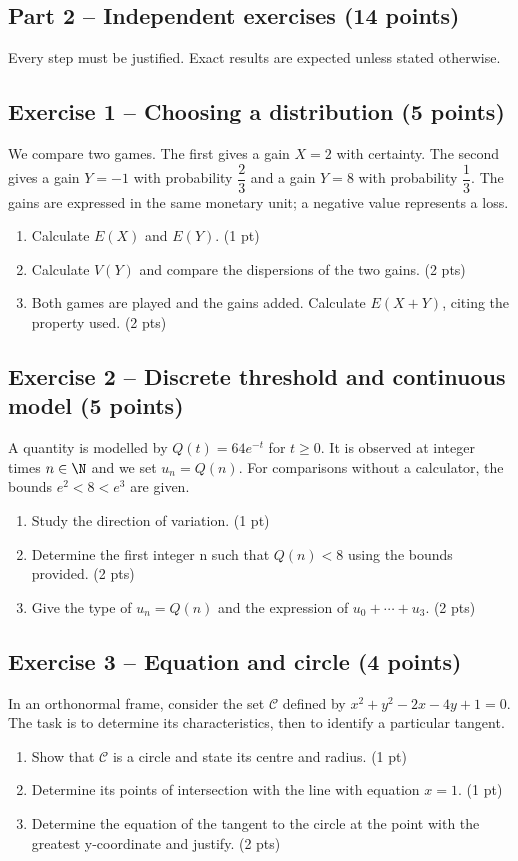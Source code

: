 \mxnewpage\subsection*{Part 2 -- Independent exercises (14 points)}
Every step must be justified. Exact results are expected unless stated otherwise.
\subsection*{Exercise 1 -- Choosing a distribution (5 points)}
We compare two games. The first gives a gain $X=2$ with certainty. The second gives a gain $Y=-1$ with probability $\dfrac23$ and a gain $Y=8$ with probability $\dfrac13$. The gains are expressed in the same monetary unit; a negative value represents a loss.
\begin{enumerate}
\item Calculate $E(X)$ and $E(Y)$. \hfill(1 pt)
\item Calculate $V(Y)$ and compare the dispersions of the two gains. \hfill(2 pts)
\item Both games are played and the gains added. Calculate $E(X+Y)$, citing the property used. \hfill(2 pts)
\end{enumerate}
\subsection*{Exercise 2 -- Discrete threshold and continuous model (5 points)}
A quantity is modelled by $Q(t)=64e^{-t}$ for $t\geq0$. It is observed at integer times $n\in\N$ and we set $u_n=Q(n)$. For comparisons without a calculator, the bounds $e^2<8<e^3$ are given.
\begin{enumerate}
\item Study the direction of variation. \hfill(1 pt)
\item Determine the first integer n such that $Q(n)<8$ using the bounds provided. \hfill(2 pts)
\item Give the type of $u_n=Q(n)$ and the expression of $u_0+\cdots+u_3$. \hfill(2 pts)
\end{enumerate}
\subsection*{Exercise 3 -- Equation and circle (4 points)}
In an orthonormal frame, consider the set $\mathcal C$ defined by $x^2+y^2-2x-4y+1=0$. The task is to determine its characteristics, then to identify a particular tangent.
\begin{enumerate}
\item Show that $\mathcal C$ is a circle and state its centre and radius. \hfill(1 pt)
\item Determine its points of intersection with the line with equation $x=1$. \hfill(1 pt)
\item Determine the equation of the tangent to the circle at the point with the greatest y-coordinate and justify. \hfill(2 pts)
\end{enumerate}
